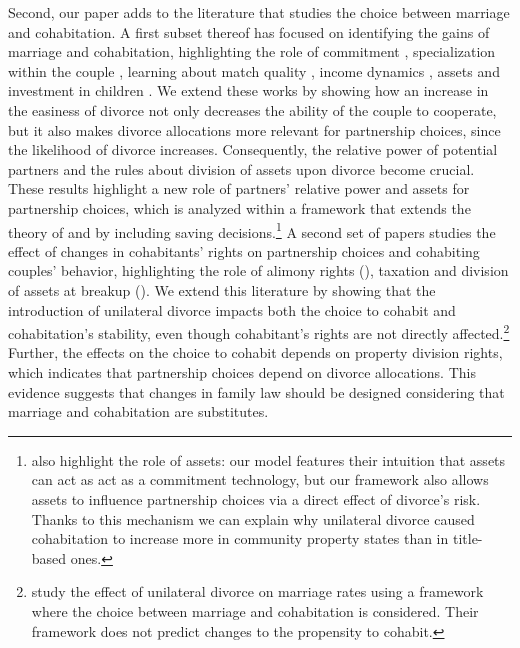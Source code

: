 \documentclass[12pt]{article}
\numberwithin{table}{section}
\begin{document}
Second, our paper adds to the literature that studies the choice between marriage and cohabitation. A first subset thereof has focused on identifying the gains of marriage and cohabitation, highlighting the role of commitment \citep{matouschek2008}, specialization within the couple \citep{gemici2014}, learning about match quality \citep{brien2006}, income dynamics \citep{blasutto2020}, assets \citep{lafortune2017, lafortune2020} and investment in children \citep{lundberg2015}. We extend these works by showing how an increase in the easiness of divorce not only decreases the ability of the couple to cooperate, but it also makes divorce allocations more relevant for partnership choices, since the likelihood of divorce increases. Consequently, the relative power of potential partners and the rules about division of assets upon divorce become crucial. These results highlight a new role of partners' relative power and assets for partnership choices, which is analyzed within a framework that extends the theory of \cite{blasutto2020} and \cite{gemici2014} by including saving decisions.\footnote{\cite{lafortune2020} also highlight the role of assets: our model features their intuition that assets can act as act as a commitment technology, but our framework also allows assets to influence partnership choices via a direct effect of divorce's risk. Thanks to this mechanism we can explain why unilateral divorce caused cohabitation to increase more in community property states than in title-based ones.} A second set of papers studies the effect of changes in cohabitants' rights on partnership choices and cohabiting couples' behavior, highlighting the role of alimony rights (\citealp{chiappori2017,gousse2018}), taxation \cite{leturcq2012} and division of assets at breakup (\citealp{fisher2012,gousse2018,chigavazira2019}). We extend this literature by showing that the introduction of unilateral divorce impacts both the choice to cohabit and cohabitation's stability, even though cohabitant's rights are not directly affected.\footnote{\cite{matouschek2008} study the effect of unilateral divorce on marriage rates using a framework where the choice between marriage and cohabitation is considered. Their framework does not predict changes to the propensity to cohabit.} Further, the effects on the choice to cohabit depends on property division rights, which indicates that partnership choices depend on divorce allocations. This evidence suggests that changes in family law should be designed considering that marriage and cohabitation are substitutes. 
\end{document}
